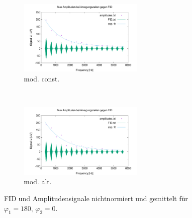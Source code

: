 \documentclass{article}
\begin{document}
        \begin{figure}[H]
            \centering
            \begin{subfigure}[b]{0.4\textwidth}
                \centering
                \includegraphics[width=6cm]{../Bilddateien/10/CPMG-180-0-constant-avg.png}
                \caption{mod. const.}
                \label{fig:CPMG-180-0-constant-avg}
            \end{subfigure}
            \
            \begin{subfigure}[b]{0.4\textwidth}
                \centering
                \includegraphics[width=6cm]{../Bilddateien/10/CPMG-180-0-alternating-avg.png}
                \caption{mod. alt.}
                \label{fig:CPMG-180-0-alternating-avg}
            \end{subfigure}
            \caption{FID und Amplitudensignale nichtnormiert und gemittelt für $\varphi_1 = 180$, $\varphi_2 = 0$.}
            \label{fig:CPMG-180-0-avg}
        \end{figure}
\end{document}
